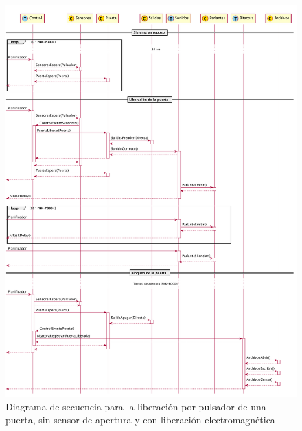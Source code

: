 \begin{figure}[ht]
	\centering
	\includegraphics[width=\textwidth]{Figures/PNK-DS001.pdf}
	\caption{Diagrama de secuencia para la liberación por pulsador de una puerta, sin sensor de apertura y con liberación electromagnética}
	\label{fig:SecuanciaPulsador}
\end{figure}

